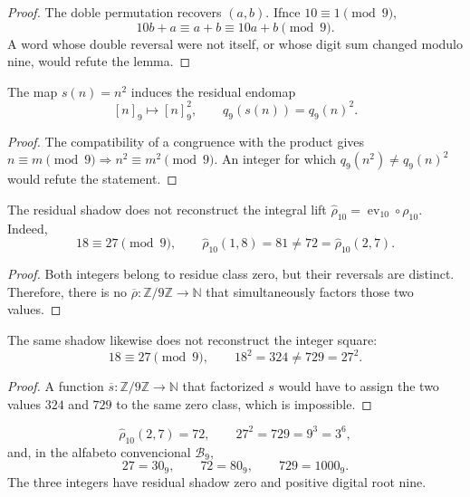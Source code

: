 \begin{proof}
The doble permutation recovers \((a,b)\). Ifnce \(10\equiv1\pmod9\),
\[
 10b+a\equiv a+b\equiv10a+b\pmod9.
\]
A word whose double reversal were not itself, or whose digit sum
changed modulo nine, would refute the lemma.
\end{proof}

\begin{lemma}
\label{int:pf84:SYN30-SQ-DESC}
The map \(s(n)=n^2\) induces the residual endomap
\[
 [n]_9\longmapsto[n]_9^2,
 \qquad q_9(s(n))=q_9(n)^2.
\]
\end{lemma}

\begin{proof}
The compatibility of a congruence with the product gives
\(n\equiv m\pmod9\Rightarrow n^2\equiv m^2\pmod9\). An integer for which
\(q_9(n^2)\ne q_9(n)^2\) would refute the statement.
\end{proof}

\begin{proposition}
\label{int:pf84:SYN30-RHO-NONFAITH}
The residual shadow does not reconstruct the integral lift
\(\widehat\rho_{10}=\operatorname{ev}_{10}\circ\rho_{10}\). Indeed,
\[
 18\equiv27\pmod9,\qquad
 \widehat\rho_{10}(1,8)=81\ne72=\widehat\rho_{10}(2,7).
\]
\end{proposition}

\begin{proof}
Both integers belong to residue class zero, but their reversals are
distinct. Therefore, there is no
\(\overline\rho:\mathbb Z/9\mathbb Z\to\mathbb N\) that simultaneously factors
those two values.
\end{proof}

\begin{proposition}
\label{int:pf84:SYN30-SQ-NONFAITH}
The same shadow likewise does not reconstruct the integer square:
\[
 18\equiv27\pmod9,\qquad
 18^2=324\ne729=27^2.
\]
\end{proposition}

\begin{proof}
A function \(\overline s:\mathbb Z/9\mathbb Z\to\mathbb N\) that
factorized \(s\) would have to assign the two values
\(324\) and \(729\) to the same zero class, which is impossible.
\end{proof}

\begin{corollary}
\label{int:pf84:SYN30-CROSS-WITNESS}
\[
 \widehat\rho_{10}(2,7)=72,\qquad
 27^2=729=9^3=3^6,
\]
and, in the alfabeto convencional \(\mathscr B_9\),
\[
 27=30_9,\qquad72=80_9,\qquad729=1000_9.
\]
The three integers have residual shadow zero and positive digital root nine.
\end{corollary}

